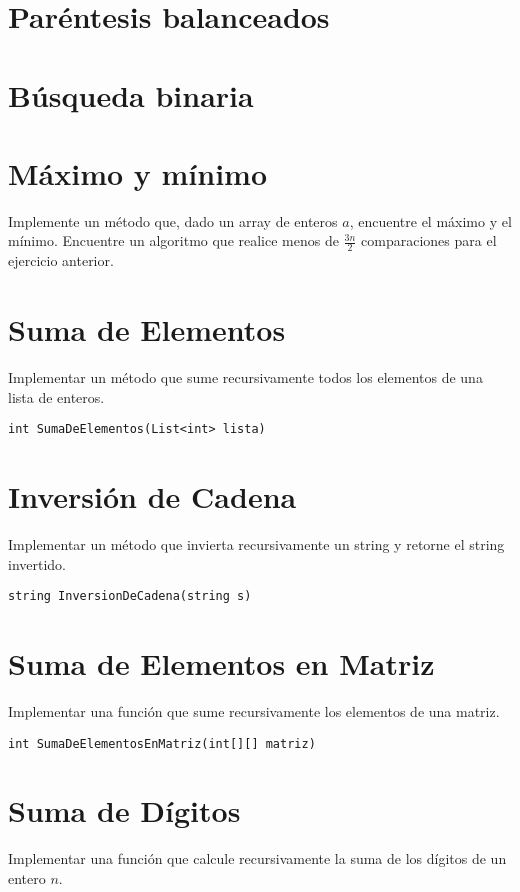 \section{Paréntesis balanceados}


\section{Búsqueda binaria}


\section{Máximo y mínimo}
Implemente un método que, dado un array de enteros \(a\), encuentre el máximo y el mínimo. Encuentre un algoritmo que realice menos de \(\frac{3 n}{2}\) comparaciones para el ejercicio anterior.

\section{Suma de Elementos}
Implementar un método que sume recursivamente todos los elementos de una lista de enteros.

\begin{verbatim}
int SumaDeElementos(List<int> lista)
\end{verbatim}

\section{Inversión de Cadena}
Implementar un método que invierta recursivamente un string y retorne el string invertido.

\begin{verbatim}
string InversionDeCadena(string s)
\end{verbatim}

\section{Suma de Elementos en Matriz}
Implementar una función que sume recursivamente los elementos de una matriz.

\begin{verbatim}
int SumaDeElementosEnMatriz(int[][] matriz)
\end{verbatim}

\section{Suma de Dígitos}
Implementar una función que calcule recursivamente la suma de los dígitos de un entero \( n \).

